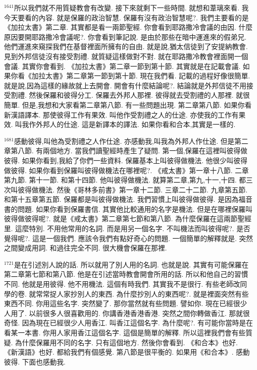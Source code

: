 \documentclass{book}
\begin{document}
$^{1641}$所以我們就不用質疑教會有改變.
接下來就剩下一些時間.
就想和葦璃來看.
我今天要看的內容.
就是保羅的政治智慧.
保羅有沒有政治智慧呢?.
我們主要看的是《加拉太書》第二章.
其實都是看一兩節聖經.
你會看到耶路撒冷會議的由因.
什麼原因要開耶路撒冷會議呢?.
你會看到筆記說.
是由於那些在暗中運進來的假弟兄.
他們運進來窺探我們在基督裡面所擁有的自由.
就是說,猶太信徒到了安提納教會.
見到外邦信徒沒有接受割禮.
就質疑這樣做對不對.
就在耶路撒冷教會裡面開一個會議.
其實你會看到.
《加拉太書》第二章一節到第十節.
其實就是在記載會議.
如果你看《加拉太書》第二章第一節到第十節.
現在我們看.
記載的過程好像很簡單.
就是說,因為這樣的緣故就上去開會.
開會有什麼結論呢?.
結論就是外邦信徒不用接受割禮.
然後保羅和彼得分工.
保羅去外邦人那裡.
彼得就去受割禮的人那裡.
就很簡單.
但是,我想和大家看第二章第八節.
有一些問題出現.
第二章第八節.
如果你看新漢語譯本.
那使彼得工作有果效.
叫他作受割禮之人的仕途.
亦使我的工作有果效.
叫我作外邦人的仕途.
這是新譯本的譯法.
如果你看和合本,其實是一樣的.

$^{1681}$感動彼得,叫他為受割禮之人作仕途.
亦感動我,叫我為外邦人作仕途.
但是第二章第八節.
有兩個地方.
當我們讀聖經時產生了疑問.
第一個,保羅在這裡叫彼得做彼得.
如果你看到,我給了你們一些資料.
保羅基本上叫彼得做機法.
他很少叫彼得做彼得.
如果你看到保羅叫彼得做機法在哪裡呢?.
《戒太書》第一章十八節.
二章第九節.
第十一節.
和第十四節.
他叫彼得做機法.
就算第二章,第九,十一,十四.
都三次叫彼得做機法.
然後《哥林多前書》第一章十二節.
三章二十二節.
九章第五節.
和第十五章第五節.
保羅都是叫彼得做機法.
我們習慣上叫彼得做彼得.
是因為福音書的問題.
如果你看到保羅書信.
其實他比較通用的名字是機法.
但是在哪裡保羅叫彼得做彼得呢?.
就是《戒太書》第二章第七節和第八節.
為什麼保羅在這兩節聖經里.
這麼特別.
不用他常用的名詞.
而是用另一個名字.
不叫機法而叫彼得呢?.
是否覺得呢?.
這是一個我們.
應該令我們有點好奇心的問題.
一個簡單的解釋就是.
突然之間變成用詞.
和過往完全不同.
很大機會保羅在那裡.

$^{1721}$是在引述別人說的話.
所以就用了別人用的名詞.
也就是說.
其實有可能保羅在第二章第七節和第八節.
他是在引述當時教會開會所用的話.
所以和他自己的習慣不同.
他就是用彼得.
他不用機法.
這個有時我們.
其實我不是很行.
有些老師改同學的卷.
就常常捉人家抄別人的東西.
為什麼抄別人的東西呢?.
就是裡面突然有些東西不同.
你用這些名字.
突然變了.
那你當然就有些問題.
譬如你.
現在已經很少人用了.
以前很多人很喜歡用的.
你講香港香港香港.
突然之間你轉做香江.
那就很奇怪.
因為現在已經很少人用香江.
叫香江這個名字.
為什麼呢?.
有可能你當時是在看某一本書.
你用人家用香江這個名字.
這個是簡單的解釋.
所以這裡我們會有些質疑.
為什麼保羅用不同的名字.
只有這個地方.
然後你會看到.
《和合本》也好.
《新漢語》也好.
都給我們有個感覺.
第八節是很平衡的.
如果用《和合本》.
感動彼得.
下面也感動我.
\end{document}
